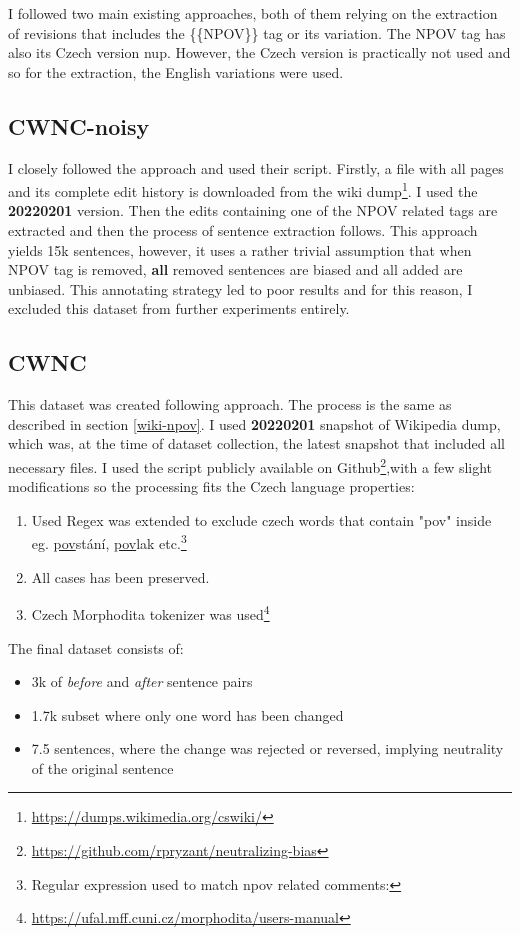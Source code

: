 I followed two main existing approaches, both of them relying on the extraction of revisions that includes the \{\{NPOV\}\} tag or its variation. The NPOV tag has also its Czech version \Gls{nup}. However, the Czech version is practically not used and so for the extraction, the English variations were used.





\subsection{CWNC-noisy}
I closely followed the \cite{aleksandrova2019multilingual} approach and used their script. Firstly, a file with all pages and its complete edit history is downloaded from the wiki dump\footnote{\url{https://dumps.wikimedia.org/cswiki/}}. I used the \textbf{20220201} version. Then the edits containing one of the NPOV related tags are extracted and then the process of sentence extraction follows.
This approach yields 15k sentences, however, it uses a rather trivial assumption that when NPOV tag is removed, \textbf{all} removed sentences are biased and all added are unbiased. This annotating strategy led to poor results and for this reason, I excluded this dataset from further experiments entirely.





\subsection{CWNC}\label{wncs}
This dataset was created following \cite{pryzant2020automatically} approach. The process is the same as described in section \ref{wiki-npov}. I used \textbf{20220201} snapshot of Wikipedia dump, which was, at the time of dataset collection, the latest snapshot that included all necessary files.
I used the script publicly available on Github\footnote{\url{https://github.com/rpryzant/neutralizing-bias}},with a few slight modifications so the processing fits the Czech language properties:
\begin{enumerate}
    \item Used Regex was extended to exclude czech words that contain "pov" inside eg. \underline{pov}stání, \underline{pov}lak etc.\footnote{Regular expression used to match npov related comments: }
    \item All cases has been preserved.
    \item Czech Morphodita tokenizer was used\footnote{\url{https://ufal.mff.cuni.cz/morphodita/users-manual}}
\end{enumerate}
The final dataset consists of:
\begin{itemize}
    \item 3k of \textit{before} and \textit{after} sentence pairs
    \item 1.7k subset where only one word has been changed
    \item 7.5 sentences, where the change was rejected or reversed, implying neutrality of the original sentence
\end{itemize}

